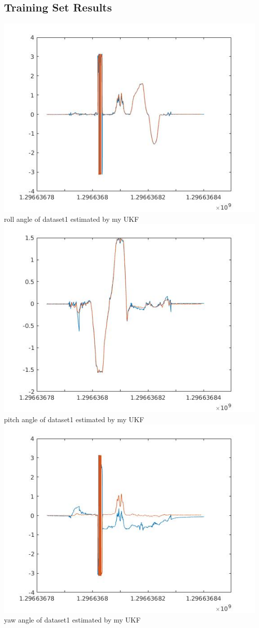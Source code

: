 \documentclass[english]{article}
\begin{document}
\subsection*{Training Set Results}
\includegraphics[scale = 0.7]{roll_kalman1.jpg}\\
roll angle of dataset1 estimated by my UKF\\
\includegraphics[scale = 0.7]{pitch_kalman1.jpg}\\
pitch angle of dataset1 estimated by my UKF\\
\includegraphics[scale = 0.7]{yaw_kalman1.jpg}\\
yaw angle of dataset1 estimated by my UKF\\
\end{document}
